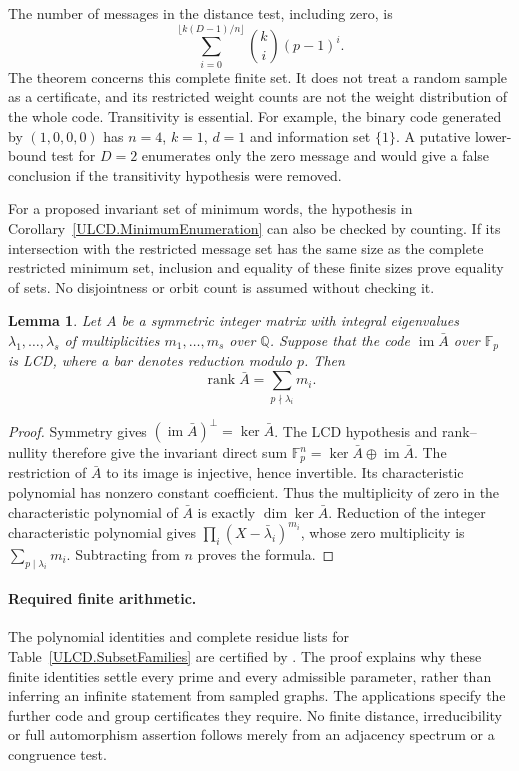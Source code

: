 \documentclass[11pt,a4paper]{article}
\newtheorem{lemma}[theorem]{Lemma}
\numberwithin{equation}{section}
\newcommand{\im}{\operatorname{im}}
\newcommand{\rank}{\operatorname{rank}}
\begin{document}
The number of messages in the distance test, including zero, is
\[
 \sum_{i=0}^{\lfloor k(D-1)/n\rfloor}\binom{k}{i}(p-1)^i.
\]
The theorem concerns this complete finite set. It does not treat a random
sample as a certificate, and its restricted weight counts are not the weight
distribution of the whole code. Transitivity is essential. For example, the
binary code generated by $(1,0,0,0)$ has $n=4$, $k=1$, $d=1$ and information
set $\{1\}$. A putative lower-bound test for $D=2$ enumerates only the zero
message and would give a false conclusion if the transitivity hypothesis
were removed.

For a proposed invariant set of minimum words, the hypothesis in
Corollary~\ref{ULCD.MinimumEnumeration} can also be checked by counting.
If its intersection with the restricted message set has the same size
as the complete restricted minimum set, inclusion and equality of these
finite sizes prove equality of sets. No disjointness or orbit count is
assumed without checking it.

\begin{lemma}\label{ULCD.Rank}
Let $A$ be a symmetric integer matrix with integral eigenvalues
$\lambda_1,\ldots,\lambda_s$ of multiplicities $m_1,\ldots,m_s$ over
$\mathbb Q$. Suppose that the code $\im\bar A$ over $\mathbb F_p$ is LCD,
where a bar denotes reduction modulo $p$. Then
\[
 \rank\bar A=\sum_{p\nmid\lambda_i}m_i.
\]
\end{lemma}
\begin{proof}
Symmetry gives $(\im\bar A)^\perp=\ker\bar A$. The LCD hypothesis and
rank--nullity therefore give the invariant direct sum
$\mathbb F_p^n=\ker\bar A\oplus\im\bar A$. The restriction of $\bar A$
to its image is injective, hence invertible. Its characteristic polynomial
has nonzero constant coefficient. Thus the multiplicity of zero in the
characteristic polynomial of $\bar A$ is exactly $\dim\ker\bar A$.
Reduction of the integer characteristic polynomial gives
$\prod_i(X-\bar\lambda_i)^{m_i}$, whose zero multiplicity is
$\sum_{p\mid\lambda_i}m_i$. Subtracting from $n$ proves the formula.
\end{proof}


\paragraph{Required finite arithmetic.}
The polynomial identities and complete residue lists for
Table~\ref{ULCD.SubsetFamilies} are certified by
. The proof explains why these finite
identities settle every prime and every admissible parameter, rather than
inferring an infinite statement from sampled graphs. The applications
specify the further code and group certificates they require. No finite
distance, irreducibility or full automorphism assertion follows merely
from an adjacency spectrum or a congruence test.
\end{document}

